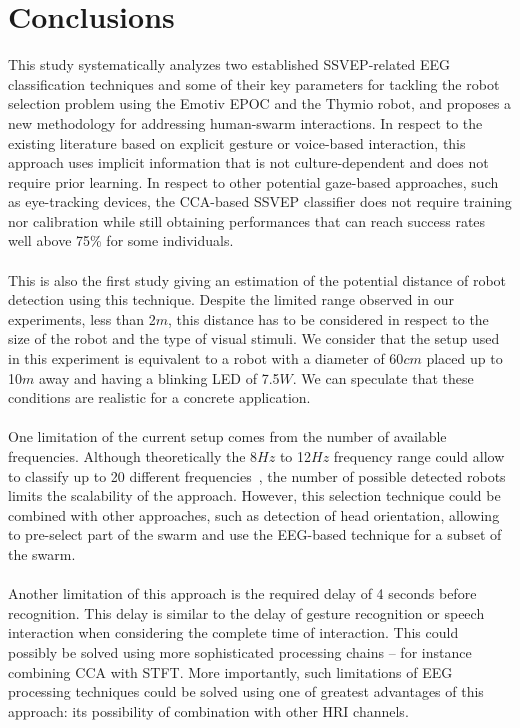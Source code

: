 \documentclass[smallextended]{svjour3}
\begin{document}
\section{Conclusions}
This study systematically analyzes two established SSVEP-related EEG classification techniques and some of their key parameters for tackling the robot selection problem using the Emotiv EPOC and the Thymio robot, and proposes a new methodology for addressing human-swarm interactions. 
In respect to the existing literature based on explicit gesture or voice-based interaction, this approach uses implicit information that is not culture-dependent and does not require prior learning. 
In respect to other potential gaze-based approaches, such as eye-tracking devices, the CCA-based SSVEP classifier does not require training nor calibration while still obtaining performances that can reach success rates well above 75\% for some individuals.\\
\\
This is also the first study giving an estimation of the potential distance of robot detection using this technique.
Despite the limited range observed in our experiments, less than 2$m$, this distance has to be considered in respect to the size of the robot and the type of visual stimuli. We consider that the setup used in this experiment is equivalent to a robot with a diameter of 60$cm$ placed up to 10$m$ away and having a blinking LED of 7.5$W$. 
We can speculate that these conditions are realistic for a concrete application.\\
\\
One limitation of the current setup comes from the number of available frequencies.
Although theoretically the 8$Hz$ to 12$Hz$ frequency range could allow to classify up to 20 different frequencies~\cite{SSVEPfiability}, the number of possible detected robots limits the scalability of the approach. 
However, this selection technique could be combined with other approaches, such as detection of head orientation, allowing to pre-select part of the swarm and use the EEG-based technique for a subset of the swarm.\\
\\
Another limitation of this approach is the required delay of 4 seconds before recognition.
This delay is similar to the delay of gesture recognition or speech interaction when considering the complete time of interaction.
This could possibly be solved using more sophisticated processing chains -- for instance combining CCA with STFT.
More importantly, such limitations of EEG processing techniques could be solved using one of greatest advantages of this approach: its possibility of combination with other HRI channels.
\end{document}
